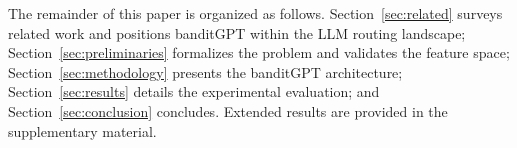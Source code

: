The remainder of this paper is organized as follows. Section~\ref{sec:related} surveys related work and positions banditGPT within the LLM routing landscape; Section~\ref{sec:preliminaries} formalizes the problem and validates the feature space; Section~\ref{sec:methodology} presents the banditGPT architecture; Section~\ref{sec:results} details the experimental evaluation; and Section~\ref{sec:conclusion} concludes. Extended results are provided in the supplementary material.
